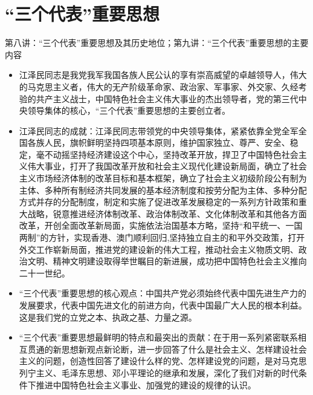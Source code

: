 \documentclass[
]{ctexart}
\begin{document}
\hypertarget{ux4e09ux4e2aux4ee3ux8868ux91cdux8981ux601dux60f3}{%
\section{``三个代表''重要思想}\label{ux4e09ux4e2aux4ee3ux8868ux91cdux8981ux601dux60f3}}

第八讲：``三个代表''重要思想及其历史地位；第九讲：``三个代表''重要思想的主要内容

\begin{itemize}
\item
  江泽民同志是我党我军我国各族人民公认的享有崇高威望的卓越领导人，伟大的马克思主义者，伟大的无产阶级革命家、政治家、军事家、外交家、久经考验的共产主义战士，中国特色社会主义伟大事业的杰出领导者，党的第三代中央领导集体的核心，``三个代表''重要思想的主要创立者。
\item
  江泽民同志的成就：江泽民同志带领党的中央领导集体，紧紧依靠全党全军全国各族人民，旗帜鲜明坚持四项基本原则，维护国家独立、尊严、安全、稳定，毫不动摇坚持经济建设这个中心，坚持改革开放，捍卫了中国特色社会主义伟大事业，打开了我国改革开放和社会主义现代化建设新局面，确立了社会主义市场经济体制的改革目标和基本框架，确立了社会主义初级阶段公有制为主体、多种所有制经济共同发展的基本经济制度和按劳分配为主体、多种分配方式并存的分配制度，制定和实施了促进改革发展稳定的一系列方针政策和重大战略，锐意推进经济体制改革、政治体制改革、文化体制改革和其他各方面改革，开创全面改革新局面，实施依法治国基本方略，坚持``和平统一、一国两制''的方针，实现香港、澳门顺利回归,坚持独立自主的和平外交政策，打开外交工作崭新局面，推进党的建设新的伟大工程，推动社会主义物质文明、政治文明、精神文明建设取得举世瞩目的新进展，成功把中国特色社会主义推向二十一世纪。
\item
  ``三个代表''重要思想的核心观点：中国共产党必须始终代表中国先进生产力的发展要求，代表中国先进文化的前进方向，代表中国最广大人民的根本利益。这是我们党的立党之本、执政之基、力量之源。
\item
  ``三个代表''重要思想最鲜明的特点和最突出的贡献：在于用一系列紧密联系相互贯通的新思想新观点新论断，进一步回答了什么是社会主义、怎样建设社会主义的问题，创造性回答了建设什么样的党、怎样建设党的问题，是对马克思列宁主义、毛泽东思想、邓小平理论的继承和发展，深化了我们对新的时代条件下推进中国特色社会主义事业、加强党的建设的规律的认识。
\end{itemize}
\end{document}
